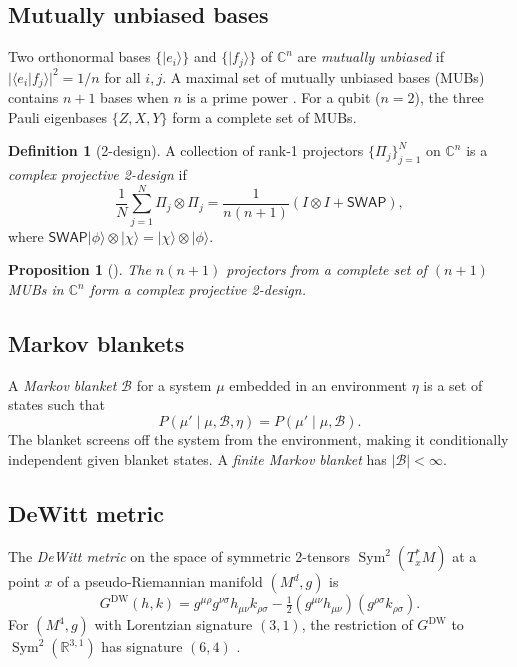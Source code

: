 \documentclass[12pt,a4paper]{article}
\newtheorem{proposition}[theorem]{Proposition}
\theoremstyle{definition}
\newtheorem{definition}[theorem]{Definition}
\newcommand{\Sym}{\operatorname{Sym}}
\newcommand{\R}{\mathbb{R}}
\newcommand{\C}{\mathbb{C}}
\newcommand{\Bcal}{\mathcal{B}}
\newcommand{\ket}[1]{| #1 \rangle}
\begin{document}
\subsection{Mutually unbiased bases}

Two orthonormal bases $\{|e_i\rangle\}$ and $\{|f_j\rangle\}$ of
$\C^n$ are \emph{mutually unbiased} if
$|\langle e_i | f_j \rangle|^2 = 1/n$ for all $i,j$. A maximal set
of mutually unbiased bases (MUBs) contains $n+1$ bases when $n$ is a
prime power \cite{WoottersFields1989,Bandyopadhyay2002}. For a qubit ($n=2$),
the three Pauli eigenbases $\{Z, X, Y\}$ form a complete set of MUBs.

\begin{definition}[2-design]
  \label{def:2design}
  A collection of rank-1 projectors $\{\Pi_j\}_{j=1}^N$ on $\C^n$ is a
  \emph{complex projective 2-design} if
  \begin{equation}
    \frac{1}{N}\sum_{j=1}^N \Pi_j \otimes \Pi_j
    = \frac{1}{n(n+1)}\left(I \otimes I + \mathsf{SWAP}\right),
  \end{equation}
  where $\mathsf{SWAP}\ket{\phi}\otimes\ket{\chi}
  = \ket{\chi}\otimes\ket{\phi}$.
\end{definition}

\begin{proposition}[{\cite{KlappeneckerRoetteler2005}}]
  \label{prop:mub-2design}
  The $n(n+1)$ projectors from a complete set of $(n+1)$ MUBs in
  $\C^n$ form a complex projective 2-design.
\end{proposition}

\subsection{Markov blankets}

A \emph{Markov blanket} $\Bcal$ for a system $\mu$ embedded in an
environment $\eta$ is a set of states such that
\begin{equation}
  \label{eq:blanket}
  P(\mu' \mid \mu, \Bcal, \eta) = P(\mu' \mid \mu, \Bcal).
\end{equation}
The blanket screens off the system from the environment, making it
conditionally independent given blanket states. A \emph{finite Markov
blanket} has $|\Bcal| < \infty$.

\subsection{DeWitt metric}

The \emph{DeWitt metric} \cite{DeWitt1967} on the space of symmetric
2-tensors $\Sym^2(T_x^*M)$ at a point $x$ of a pseudo-Riemannian
manifold $(M^d, g)$ is
\begin{equation}
  \label{eq:dewitt}
  G^{\mathrm{DW}}(h, k)
  = g^{\mu\rho}g^{\nu\sigma}h_{\mu\nu}k_{\rho\sigma}
  - \tfrac{1}{2}\left(g^{\mu\nu}h_{\mu\nu}\right)
    \left(g^{\rho\sigma}k_{\rho\sigma}\right).
\end{equation}
For $(M^4, g)$ with Lorentzian signature $(3,1)$, the restriction of
$G^{\mathrm{DW}}$ to $\Sym^2(\R^{3,1})$ has signature $(6,4)$
\cite{Paper1,Schmidt2001}.
\end{document}
